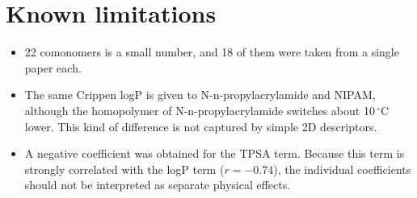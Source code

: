 \documentclass[11pt,a4paper]{article}
\newcommand{\degC}{\ensuremath{^{\circ}}C}
\begin{document}
\section*{Known limitations}

\begin{itemize}
  \item 22 comonomers is a small number, and 18 of them were taken from a single paper each.
  \item The same Crippen logP is given to N-n-propylacrylamide and NIPAM, although the
  homopolymer of N-n-propylacrylamide switches about 10\,\degC{} lower. This kind of
  difference is not captured by simple 2D descriptors.
  \item A negative coefficient was obtained for the TPSA term. Because this term is
  strongly correlated with the logP term ($r = -0.74$), the individual coefficients
  should not be interpreted as separate physical effects.
\end{itemize}
\end{document}
